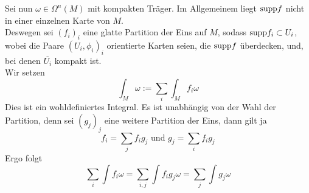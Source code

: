 \Def{}
Sei nun $\omega \in \Omega^n(M)$ mit kompakten Träger. Im Allgemeinem liegt $\text{supp} f$ nicht in einer einzelnen Karte von $M$.\\
Deswegen sei $(f_i)_i$ eine glatte Partition der Eins auf $M$, sodass $\text{supp} f_i \subset U_i$, wobei die Paare $(U_i, \phi_i)_i$ orientierte Karten seien, die $\text{supp} f$ überdecken, und, bei denen $\overline{U_i}$ kompakt ist.\\
Wir setzen
\[ \int_M \omega := \sum_i\int_M f_i \omega \]
Dies ist ein wohldefiniertes Integral. Es ist unabhängig von der Wahl der Partition, denn sei $(g_j)_j$ eine weitere Partition der Eins, dann gilt ja
\[ f_i = \sum_j f_i g_j \text{ und } g_j = \sum_i f_i g_j \]
Ergo folgt
\[ \sum_i \int f_i \omega = \sum_{i,j} \int f_i g_j \omega = \sum_j \int g_j \omega \]